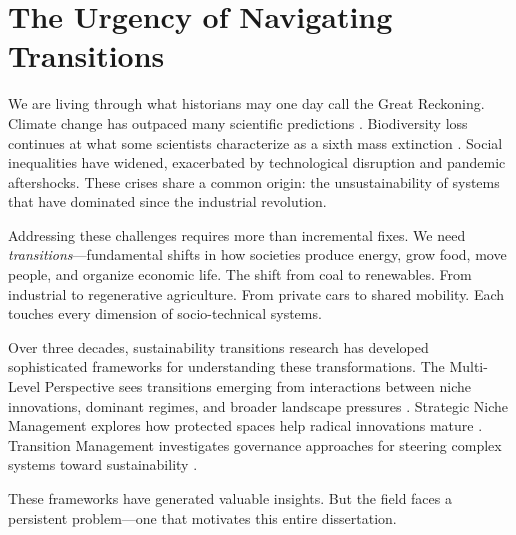 \documentclass[../main.tex]{subfiles}
\begin{document}
\section{The Urgency of Navigating Transitions}
\label{sec:intro:urgency}

We are living through what historians may one day call the Great Reckoning. Climate change has outpaced many scientific predictions \cite{ipcc2023ar6}. Biodiversity loss continues at what some scientists characterize as a sixth mass extinction \cite{ipbes2019global}. Social inequalities have widened, exacerbated by technological disruption and pandemic aftershocks. These crises share a common origin: the unsustainability of systems that have dominated since the industrial revolution.

Addressing these challenges requires more than incremental fixes. We need \emph{transitions}---fundamental shifts in how societies produce energy, grow food, move people, and organize economic life. The shift from coal to renewables. From industrial to regenerative agriculture. From private cars to shared mobility. Each touches every dimension of socio-technical systems.

Over three decades, sustainability transitions research has developed sophisticated frameworks for understanding these transformations. The Multi-Level Perspective sees transitions emerging from interactions between niche innovations, dominant regimes, and broader landscape pressures \cite{geels2002technological}. Strategic Niche Management explores how protected spaces help radical innovations mature \cite{smith2007snm}. Transition Management investigates governance approaches for steering complex systems toward sustainability \cite{kemp2007tm}.

These frameworks have generated valuable insights. But the field faces a persistent problem---one that motivates this entire dissertation.

\begin{center}
\label{fig:intro:depth-breadth}
\end{center}
\end{document}

